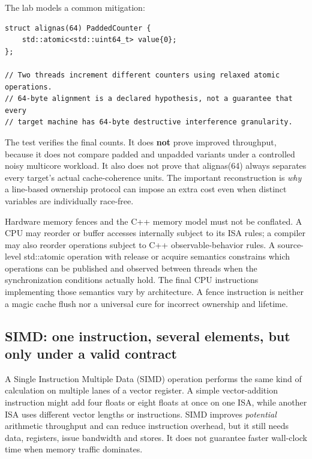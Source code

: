 The lab models a common mitigation:

\begin{verbatim}
struct alignas(64) PaddedCounter {
    std::atomic<std::uint64_t> value{0};
};

// Two threads increment different counters using relaxed atomic operations.
// 64-byte alignment is a declared hypothesis, not a guarantee that every
// target machine has 64-byte destructive interference granularity.
\end{verbatim}

The test verifies the final counts. It does \textbf{not} prove improved throughput, because it does not compare padded and unpadded variants under a controlled noisy multicore workload. It also does not prove that alignas(64) always separates every target's actual cache-coherence units. The important reconstruction is \emph{why} a line-based ownership protocol can impose an extra cost even when distinct variables are individually race-free.

Hardware memory fences and the C++ memory model must not be conflated. A CPU may reorder or buffer accesses internally subject to its ISA rules; a compiler may also reorder operations subject to C++ observable-behavior rules. A source-level std::atomic operation with release or acquire semantics constrains which operations can be published and observed between threads when the synchronization conditions actually hold. The final CPU instructions implementing those semantics vary by architecture. A fence instruction is neither a magic cache flush nor a universal cure for incorrect ownership and lifetime.

\subsection{SIMD: one instruction, several elements, but only under a valid contract}\label{05-engine-i-ch007-simd-one-instruction-several-elements-but-only-under-a-valid-contract}

A Single Instruction Multiple Data (SIMD) operation performs the same kind of calculation on multiple lanes of a vector register. A simple vector-addition instruction might add four floats or eight floats at once on one ISA, while another ISA uses different vector lengths or instructions. SIMD improves \emph{potential} arithmetic throughput and can reduce instruction overhead, but it still needs data, registers, issue bandwidth and stores. It does not guarantee faster wall-clock time when memory traffic dominates.

